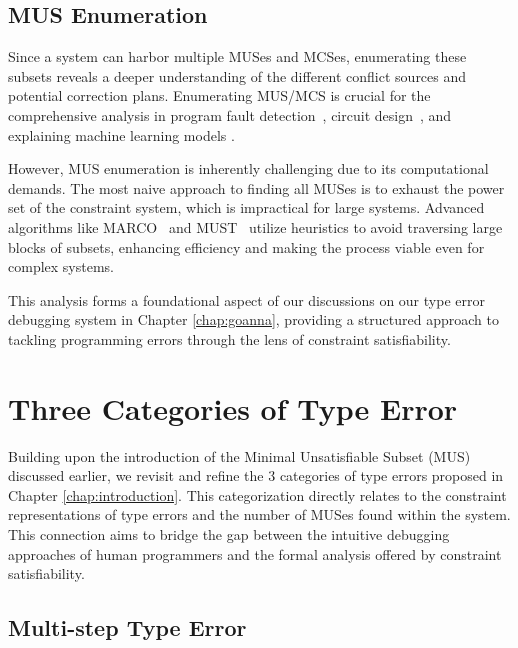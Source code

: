 \subsection{MUS Enumeration}

Since a system can harbor multiple MUSes and MCSes, enumerating these subsets reveals a deeper understanding of the different conflict sources and potential correction plans. Enumerating MUS/MCS is crucial for the comprehensive analysis in program fault detection~\cite{Bekkouche2015-is}, circuit design~\cite{Gaber2022-te}, and explaining machine learning models \cite{Marques-Silva2023-nk}.

However, MUS enumeration is inherently challenging due to its computational demands. The most naive approach to finding all MUSes is to exhaust the power set of the constraint system, which is impractical for large systems. Advanced algorithms like MARCO~\cite{Liffiton2016-xi} and MUST~\cite{Bendik2020-pz} utilize heuristics to avoid traversing large blocks of subsets, enhancing efficiency and making the process viable even for complex systems.

This analysis forms a foundational aspect of our discussions on our type error debugging system in Chapter \ref{chap:goanna}, providing a structured approach to tackling programming errors through the lens of constraint satisfiability.

\section{Three Categories of Type Error}

Building upon the introduction of the Minimal Unsatisfiable Subset (MUS) discussed earlier, we revisit and refine the 3 categories of type errors proposed in Chapter \ref{chap:introduction}. This categorization directly relates to the constraint representations of type errors and the number of MUSes found within the system. This connection aims to bridge the gap between the intuitive debugging approaches of human programmers and the formal analysis offered by constraint satisfiability.

\subsection{Multi-step Type Error}

